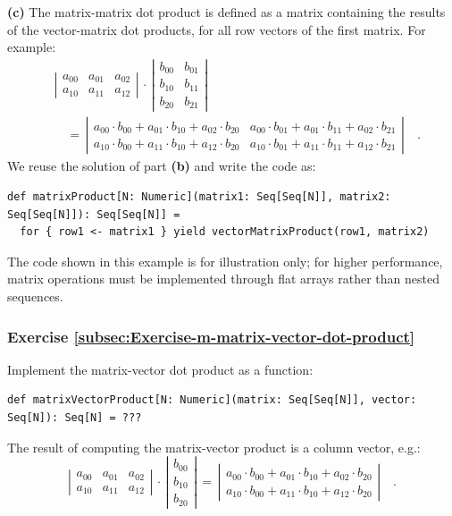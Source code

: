 \textbf{(c)} The matrix-matrix
dot product is defined as a matrix containing the results of the vector-matrix
dot products, for all row vectors of the first matrix. For example:
\begin{align*}
 & \left|\begin{array}{ccc}
a_{00} & a_{01} & a_{02}\\
a_{10} & a_{11} & a_{12}
\end{array}\right|\,\cdot\,\left|\begin{array}{cc}
b_{00} & b_{01}\\
b_{10} & b_{11}\\
b_{20} & b_{21}
\end{array}\right|\\
 & \quad=\,\left|\begin{array}{cc}
a_{00}\cdot b_{00}+a_{01}\cdot b_{10}+a_{02}\cdot b_{20} & a_{00}\cdot b_{01}+a_{01}\cdot b_{11}+a_{02}\cdot b_{21}\\
a_{10}\cdot b_{00}+a_{11}\cdot b_{10}+a_{12}\cdot b_{20} & a_{10}\cdot b_{01}+a_{11}\cdot b_{11}+a_{12}\cdot b_{21}
\end{array}\right|\quad.
\end{align*}
We reuse the solution of part \textbf{(b)} and write the code as:
\begin{lstlisting}
def matrixProduct[N: Numeric](matrix1: Seq[Seq[N]], matrix2: Seq[Seq[N]]): Seq[Seq[N]] =
  for { row1 <- matrix1 } yield vectorMatrixProduct(row1, matrix2)
\end{lstlisting}

The code shown in this example is for illustration only; for higher
performance, matrix operations must be implemented through flat arrays
rather than nested sequences.

\subsubsection{Exercise \label{subsec:Exercise-m-matrix-vector-dot-product}\ref{subsec:Exercise-m-matrix-vector-dot-product}}

Implement the matrix-vector dot product as a function:
\begin{lstlisting}
def matrixVectorProduct[N: Numeric](matrix: Seq[Seq[N]], vector: Seq[N]): Seq[N] = ???
\end{lstlisting}
The result of computing the matrix-vector product is a column vector,
e.g.:
\[
\left|\begin{array}{ccc}
a_{00} & a_{01} & a_{02}\\
a_{10} & a_{11} & a_{12}
\end{array}\right|\,\cdot\,\left|\begin{array}{c}
b_{00}\\
b_{10}\\
b_{20}
\end{array}\right|\,=\,\left|\begin{array}{c}
a_{00}\cdot b_{00}+a_{01}\cdot b_{10}+a_{02}\cdot b_{20}\\
a_{10}\cdot b_{00}+a_{11}\cdot b_{10}+a_{12}\cdot b_{20}
\end{array}\right|\quad.
\]


